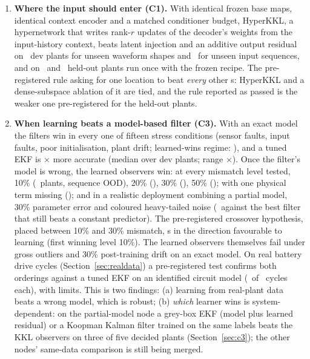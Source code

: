 \begin{enumerate}[leftmargin=1.6em,itemsep=1pt]
\item \textbf{Where the input should enter (C1).} With identical frozen base maps, identical context encoder and a matched conditioner budget, HyperKKL, a hypernetwork that writes rank-$r$ updates of the decoder's weights from the input-history context, beats latent injection and an additive output residual on \ConeWeightSpaceBeatsLatConcShape\ dev plants for unseen waveform shapes and \ConeWeightSpaceBeatsLatConcSeq\ for unseen input sequences, and on \CtestWeightSpaceBeatsLatConcShape\ and \CtestWeightSpaceBeatsLatConcSeq\ held-out plants run once with the frozen recipe. The pre-registered rule asking for one location to beat \emph{every} other \FAIL s: HyperKKL and a dense-subspace ablation of it are tied, and the rule reported as passed is the weaker one pre-registered for the held-out plants.
\item \textbf{When learning beats a model-based filter (C3).} With an exact model the filters win in every one of fifteen stress conditions (sensor faults, input faults, poor initialisation, plant drift; learned-wins regime: \CthreeFaultsRegimes), and a tuned EKF is \ConeLearnedOverEkfMedianSeq$\times$ more accurate (median over dev plants; range \ConeLearnedOverEkfRangeSeq$\times$). Once the filter's model is wrong, the learned observers win: at every mismatch level tested, 10\% (\CthreeMismatchTenSeqVsWorking\ plants, sequence OOD), 20\% (\CthreeMismatchTwentySeqVsWorking), 30\% (\CthreeMismatchThirtySeqVsWorking), 50\% (\CthreeMismatchFiftySeqVsWorking); with one physical term missing (\CthreePartialSeqVsWorking); and in a realistic deployment combining a partial model, 30\% parameter error and coloured heavy-tailed noise (\CthreeRealisticSeqVsWorking\ against the best filter that still beats a constant predictor). The pre-registered crossover hypothesis, placed between 10\% and 30\% mismatch, \FAIL s in the direction favourable to learning (first winning level 10\%). The learned observers themselves fail under gross outliers and 30\% post-training drift on an exact model. On real battery drive cycles (Section~\ref{sec:realdata}) a pre-registered test confirms both orderings against a tuned EKF on an identified circuit model (\RealHOneLearnedBetter\ of \RealNTestCycles\ cycles each), with limits. This is two findings: (a) learning from real-plant data beats a wrong model, which is robust; (b) \emph{which} learner wins is system-dependent: on the partial-model node a grey-box EKF (model plus learned residual) or a Koopman Kalman filter trained on the same labels beats the KKL observers on three of five decided plants (Section~\ref{sec:c3}); the other nodes' same-data comparison is still being merged.

\end{enumerate}
